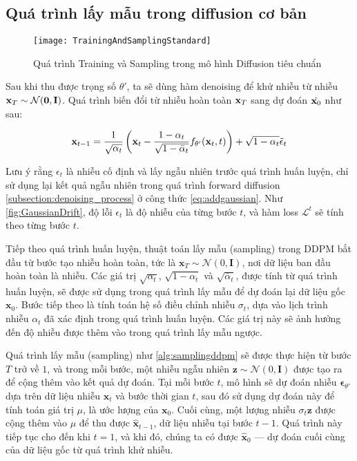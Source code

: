 \subsection{Quá trình lấy mẫu trong diffusion cơ bản}
	
		\begin{figure*}
		\centering
		\texttt{[image: TrainingAndSamplingStandard]}
		\caption{Quá trình Training và Sampling trong mô hình Diffusion tiêu chuẩn}
		\label{fig:GaussianDrift}
	\end{figure*}
	

	Sau khi thu được trọng số $\theta'$, ta sẽ dùng hàm denoising để khử nhiễu từ nhiễu $\mathbf{x}_T \sim \mathcal{N} (\mathbf{0}, \mathbf{I})$.
	Quá trình biến đổi từ nhiễu hoàn toàn $\mathbf{x}_{T}$ sang dự đoán $\hat{\mathbf{x}_0}$ như sau:
	
	\begin{equation}
		\label{eq:adddenoising}
	\mathbf{x}_{t-1} = \frac{1}{\sqrt{\alpha_t}} \left( \mathbf{x}_t - \frac{1- \alpha_t}{\sqrt{1 - \bar{\alpha}_t}} f_{\theta'}(\mathbf{x}_t, t) \right) + \sqrt{1 - \alpha_t} \tilde{\epsilon}_t
	\end{equation}
	
Lưu ý rằng $\epsilon_t$ là nhiễu cố định và lấy ngẫu nhiên trước quá trình huấn luyện, chỉ sử dụng lại kết quả ngẫu nhiên trong quá trình forward diffusion \autoref{subsection:denoising_process} ở công thức  \autoref{eq:addgaussian}. Như \autoref{fig:GaussianDrift}, độ lỗi $\epsilon_t$ là độ nhiễu của từng bước $t$, và hàm loss  $\mathcal{L}^{t}$ sẽ tính theo từng bước $t$.


Tiếp theo quá trình huấn luyện, thuật toán lấy mẫu (sampling) trong DDPM bắt đầu từ bước tạo nhiễu hoàn toàn, tức là $\mathbf{x}_T \sim \mathcal{N}(0, \mathbf{I})$, nơi dữ liệu ban đầu hoàn toàn là nhiễu. Các giá trị $\sqrt{\alpha_t}$, $\sqrt{1 - \alpha_t}$ và $\sqrt{\bar{\alpha}_t}$, được tính từ quá trình huấn luyện, sẽ được sử dụng trong quá trình lấy mẫu để dự đoán lại dữ liệu gốc $\mathbf{x}_0$. Bước tiếp theo là tính toán hệ số điều chỉnh nhiễu $\sigma_t$, dựa vào lịch trình nhiễu $\alpha_t$ đã xác định trong quá trình huấn luyện. Các giá trị này sẽ ảnh hưởng đến độ nhiễu được thêm vào trong quá trình lấy mẫu ngược.

Quá trình lấy mẫu (sampling) như \autoref{alg:samplingddpm} sẽ được thực hiện từ bước $T$ trở về $1$, và trong mỗi bước, một nhiễu ngẫu nhiên $\mathbf{z} \sim \mathcal{N}(0, \mathbf{I})$ được tạo ra để cộng thêm vào kết quả dự đoán. Tại mỗi bước $t$, mô hình sẽ dự đoán nhiễu $\boldsymbol{\epsilon}_{\theta'}$ dựa trên dữ liệu nhiễu $\mathbf{x}_t$ và bước thời gian $t$, sau đó sử dụng dự đoán này để tính toán giá trị $\mu$, là ước lượng của $\mathbf{x}_0$. Cuối cùng, một lượng nhiễu $\sigma_t \mathbf{z}$ được cộng thêm vào $\mu$ để thu được $\hat{\mathbf{x}}_{t-1}$, dữ liệu nhiễu tại bước $t-1$. Quá trình này tiếp tục cho đến khi $t = 1$, và khi đó, chúng ta có được $\hat{\mathbf{x}}_0$ — dự đoán cuối cùng của dữ liệu gốc từ quá trình khử nhiễu.


